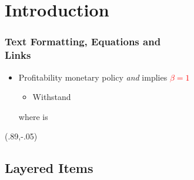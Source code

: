 \documentclass[12pt,aspectratio=169,xcolor=dvipsnames]{beamer}						%
\begin{document}
%



\section{Introduction}

 \begin{frame}[label=LinkA]
	\frametitle{Text Formatting, Equations and \\ \vspace{-.4cm} Links}
	\begin{itemize}
		\item Profitability \alert{monetary policy} \textit{and} implies \textcolor{red}{$\beta = 1$}
		\iftoggle{long}{\pause}{}
		\begin{itemize}
			\item Withstand 
		\end{itemize}
	
	\vspace{-0.8cm}
	\quad where is
	\end{itemize}
	\begin{textblock*}{3cm}(.89\textwidth,-.05\textheight)
		\hyperlink{LinkB}{}
	\end{textblock*}
\end{frame}

\subsection{Layered Items}
\end{document}
